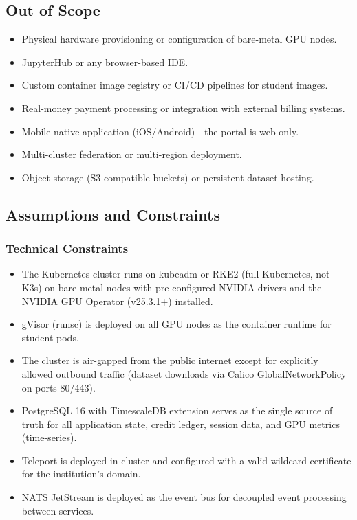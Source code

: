 \documentclass[12pt,a4paper]{article}
\begin{document}
\subsection{Out of Scope}

\begin{itemize}[leftmargin=1.5em]
  \item Physical hardware provisioning or configuration of bare-metal GPU nodes.
  \item JupyterHub or any browser-based IDE.
  \item Custom container image registry or CI/CD pipelines for student images.
  \item Real-money payment processing or integration with external billing systems.
  \item Mobile native application (iOS/Android) - the portal is web-only.
  \item Multi-cluster federation or multi-region deployment.
  \item Object storage (S3-compatible buckets) or persistent dataset hosting.
\end{itemize}

\subsection{Assumptions and Constraints}

\subsubsection*{Technical Constraints}
\begin{itemize}[leftmargin=1.5em]
  \item The Kubernetes cluster runs on kubeadm or RKE2 (full Kubernetes, not K3s) on bare-metal nodes with pre-configured NVIDIA drivers and the NVIDIA GPU Operator (v25.3.1+) installed.
  \item gVisor (runsc) is deployed on all GPU nodes as the container runtime for student pods.
  \item The cluster is air-gapped from the public internet except for explicitly allowed outbound traffic (dataset downloads via Calico GlobalNetworkPolicy on ports 80/443).
  \item PostgreSQL 16 with TimescaleDB extension serves as the single source of truth for all application state, credit ledger, session data, and GPU metrics (time-series).
  \item Teleport is deployed in cluster and configured with a valid wildcard certificate for the institution's domain.
  \item NATS JetStream is deployed as the event bus for decoupled event processing between services.
\end{itemize}
\end{document}
